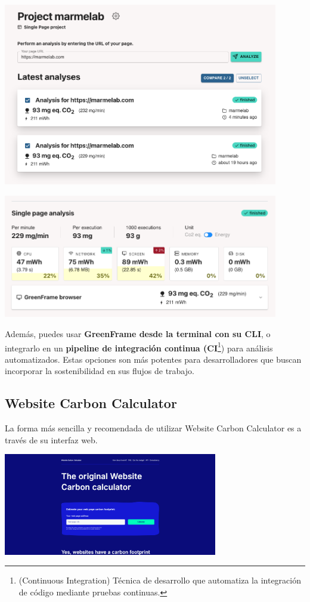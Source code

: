 \documentclass[12pt,a4paper]{report}
\begin{document}
\begin{center}
  \includegraphics[width=0.9\textwidth]{imagenes/Greenframe_7.png}
\end{center}

\begin{center}
  \includegraphics[width=0.9\textwidth]{imagenes/Greenframe_8.png}
\end{center}

Además, puedes usar \textbf{GreenFrame desde la terminal con su CLI}, o
integrarlo en un \textbf{pipeline de integración continua
  (CI}\footnote{(Continuous Integration) Técnica de desarrollo que automatiza la
  integración de código mediante pruebas continuas.}) para análisis
automatizados. Estas opciones son más potentes para desarrolladores que buscan
incorporar la sostenibilidad en sus flujos de trabajo.

\subsection{Website Carbon Calculator}
La forma más sencilla y recomendada de utilizar Website Carbon Calculator es a
través de su interfaz web.

\begin{center}
  \includegraphics[width=0.7\textwidth]{imagenes/WCC_1.png}
\end{center}
\end{document}

